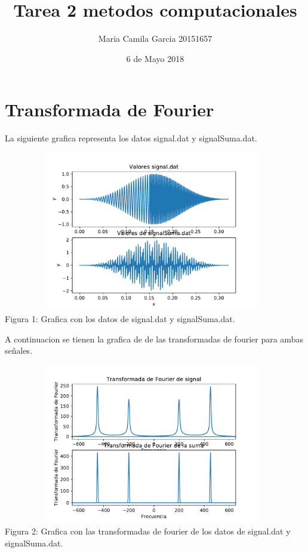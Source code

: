 \documentclass{article}
\title{Tarea 2 metodos computacionales}
\author{Maria Camila Garcia 20151657 }
\date{6 de Mayo 2018}
\begin{document}
\maketitle
\section{Transformada de Fourier}

La siguiente grafica representa los datos signal.dat y signalSuma.dat.

\begin{center}
\includegraphics[width=13cm, height=7cm]{GarciaCamila_SubplotsGraficas.pdf}\\
\small{Figura 1: Grafica con los datos de signal.dat y signalSuma.dat.}
\end{center}

A continuacion se tienen la grafica de de las transformadas de fourier para ambas señales. 

\begin{center}
\includegraphics[width=13cm, height=7cm]{GarciaCamila_Transformadas.pdf}\\
\small{Figura 2: Grafica con las transformadas de fourier de los datos de signal.dat y signalSuma.dat.}
\end{center}
\end{document}
